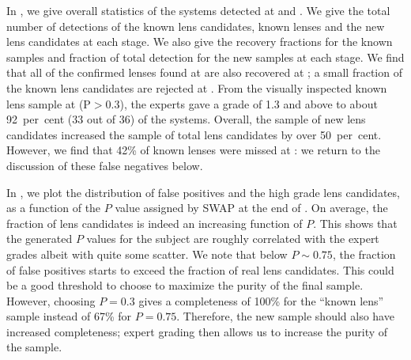 \documentclass[useAMS,usenatbib,a4paper]{mn2e}
\begin{document}
In , we give overall statistics of the systems
detected at \StageOne and \StageTwo. We give the total number of
detections of the known lens candidates, known lenses and the new lens
candidates at each stage.  We also give the recovery fractions for the
known samples and fraction of total detection for the new samples at
each stage. We find that all of the confirmed lenses found
at \StageOne are also recovered at \StageTwo; a small fraction of
the known lens candidates are rejected at \StageTwo. From the visually
inspected known lens sample at \StageTwo (P$> 0.3$), the experts gave a
grade of 1.3 and above to about 92~per~cent (33 out of 36) of the systems. Overall,
the sample of new \sw lens candidates increased the sample of total
\cfhtls lens candidates by over 50~per~cent. However, we find that 42\% of known
lenses were missed at \StageOne: we return to the discussion of these false
negatives below.

In , we plot the distribution of false positives and
the high grade lens candidates,
as a function of the $P$ value assigned by SWAP at the end of \StageTwo.
On average, the fraction of lens candidates is indeed an increasing
function of $P$. This shows that the \sw generated $P$ values for the
subject are roughly correlated with the expert grades albeit with quite
some scatter.  We note that below $P\sim0.75$,
the fraction of false positives starts to exceed the fraction of real
lens candidates. This could be a good threshold to choose to maximize
the purity of the final sample. However, choosing
$P=0.3$ gives a completeness of 100\% for the ``known
lens'' sample instead of 67\% for $P=0.75$. Therefore, the new sample
should also have increased completeness; expert
grading then allows us to increase the purity of the sample.
\end{document}
